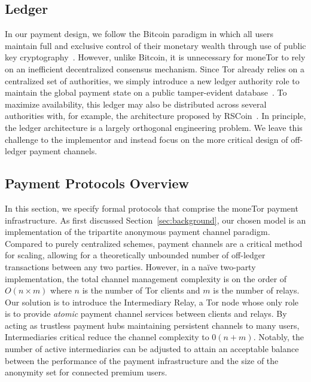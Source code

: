 \subsection{Ledger}

In our payment design, we follow the Bitcoin paradigm in which all users maintain full and exclusive control of their monetary wealth through use of public key cryptography~\cite{nakamoto2008bitcoin}.
However, unlike Bitcoin, it is unnecessary for moneTor to rely on an inefficient decentralized consensus mechanism.
Since Tor already relies on a centralized set of authorities, we simply introduce a new ledger authority role to maintain the global payment state on a public tamper-evident database~\cite{crosby2009efficient}.
To maximize availability, this ledger may also be distributed across several authorities with, for example, the architecture proposed by RSCoin~\cite{danezis2015centrally}.
In principle, the ledger architecture is a largely orthogonal engineering problem.
We leave this challenge to the implementor and instead focus on the more critical design of off-ledger payment channels.

\subsection{Payment Protocols Overview}
\label{sec:payment_overview}

In this section, we specify formal protocols that comprise the moneTor payment infrastructure.
As first discussed Section~\ref{sec:background}, our chosen model is an implementation of the tripartite anonymous payment channel paradigm.
Compared to purely centralized schemes, payment channels are a critical method for scaling, allowing for a theoretically unbounded number of off-ledger transactions between any two parties.
However, in a na\"{i}ve two-party implementation, the total channel management complexity is on the order of $O(n \times m)$ where $n$ is the number of Tor clients and $m$ is the number of relays.
Our solution is to introduce the Intermediary Relay, a Tor node whose only role is to provide \emph{atomic} payment channel services between clients and relays.
By acting as trustless payment hubs maintaining persistent channels to many users, Intermediaries critical reduce the channel complexity to $0(n+m)$.
Notably, the number of active intermediaries can be adjusted to attain an acceptable balance between the performance of the payment infrastructure and the size of the anonymity set for connected premium users.

